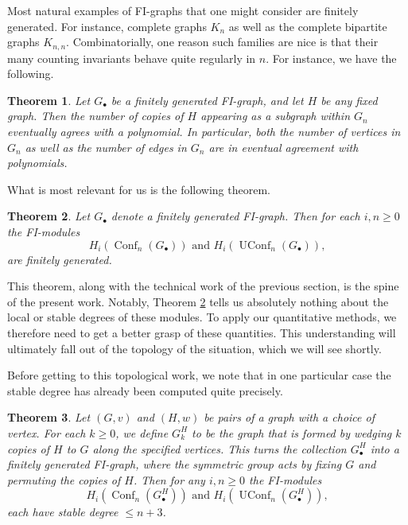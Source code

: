 \documentclass[12pt]{amsart}
\newtheorem{thm}{Theorem}[section]
\theoremstyle{definition}
\newcommand{\conf}{\operatorname{Conf}}
\newcommand{\uconf}{\operatorname{UConf}}
\begin{document}
Most natural examples of FI-graphs that one might consider are finitely generated. For instance, complete graphs $K_n$ as well as the complete bipartite graphs $K_{n,n}$. Combinatorially, one reason such families are nice is that their many counting invariants behave quite regularly in $n$. For instance, we have the following.

\begin{thm}\cite[Theorem B]{RW}
    Let $G_\bullet$ be a finitely generated FI-graph, and let $H$ be any fixed graph. Then the number of copies of $H$ appearing as a subgraph within $G_n$ eventually agrees with a polynomial. In particular, both the number of vertices in $G_n$ as well as the number of edges in $G_n$ are in eventual agreement with polynomials.
\end{thm}


What is most relevant for us is the following theorem.

\begin{thm} \cite[Theorem G]{RW} \label{Gconffg}
    Let $G_\bullet$ denote a finitely generated FI-graph. Then for each $i,n \geq 0$ the FI-modules
    \[
    H_i(\conf_n(G_\bullet)) \text{ and } H_i(\uconf_n(G_\bullet)),
    \]
    are finitely generated.
\end{thm}

This theorem, along with the technical work of the previous section, is the spine of the present work. Notably, Theorem \ref{Gconffg} tells us absolutely nothing about the local or stable degrees of these modules. To apply our quantitative methods, we therefore need to get a better grasp of these quantities. This understanding will ultimately fall out of the topology of the situation, which we will see shortly.

Before getting to this topological work, we note that in one particular case the stable degree has already been computed quite precisely.

\begin{thm}\cite[Theorem C]{Lut}\label{specialCase}
    Let $(G,v)$ and $(H,w)$ be pairs of a graph with a choice of vertex. For each $k \geq 0$, we define $G_k^H$ to be the graph that is formed by wedging $k$ copies of $H$ to $G$ along the specified vertices. This turns the collection $G_\bullet^H$ into a finitely generated FI-graph, where the symmetric group acts by fixing $G$ and permuting the copies of $H$. Then for any $i,n \geq 0$ the FI-modules
    \[
    H_i(\conf_n(G^H_\bullet)) \text{ and } H_i(\uconf_n(G^H_\bullet)),
    \]
    each have stable degree $\leq n+3$.
\end{thm}
\end{document}
